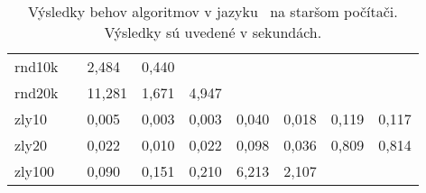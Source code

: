 \begin{table}[h]
\begin{tabular}{lllllllll}
		rnd10k  &       & 2,484  & 0,440   &          &            &            &          &         \\
		rnd20k  &       & 11,281 & 1,671   & 4,947    &            &            &          &         \\
		zly10   &       & 0,005  & 0,003   & 0,003    & 0,040      & 0,018      & 0,119    & 0,117   \\
		zly20   &       & 0,022  & 0,010   & 0,022    & 0,098      & 0,036      & 0,809    & 0,814   \\
		zly100  &       & 0,090  & 0,151   & 0,210    & 6,213      & 2,107      &          &         \\ \hline
	\end{tabular}
	\caption{Výsledky behov algoritmov v jazyku \Java\ na staršom počítači. Výsledky sú uvedené v sekundách.}
	\label{table:java-stare}
\end{table}

